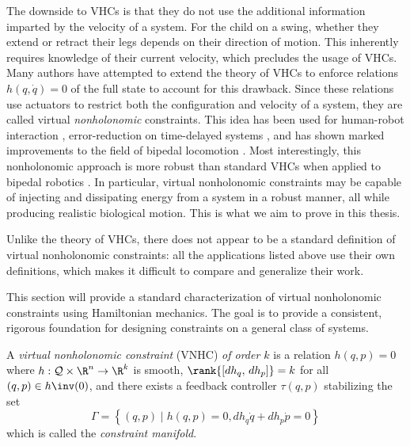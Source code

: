 The downside to VHCs is that they do not use the additional information imparted
by the velocity of a system.
For the child on a swing, whether they extend or retract their legs
depends on their direction of motion. 
This inherently requires knowledge of their current velocity, which precludes
the usage of VHCs. 
Many authors have attempted to extend the theory of VHCs to enforce relations
\(h(q,\dot{q}) = 0\) of the full state to account for this drawback. 
Since these relations use actuators to restrict both the configuration and
velocity of a system, they are called virtual \textit{nonholonomic} constraints.
This idea has been used for human-robot interaction
\cite{vnhc_human_robot_cooperation,psd_based_vnhc_redundant_manipulator,haptic_vnhc},
error-reduction on time-delayed systems \cite{vnhc_time_delay_teleop},
and has shown marked improvements to the field of bipedal locomotion 
\cite{nhvc_dynamic_walking,
hybrid_zero_dynamics_bipedal_nhvcs,output_nhvc_bipedal_control}.
Most interestingly, this nonholonomic approach is more robust
than standard VHCs when applied to bipedal robotics \cite{nhvc_incline_walking}.
In particular, virtual nonholonomic constraints may be capable of injecting and
dissipating energy from a system in a robust manner, all while producing
realistic biological motion. This is what we aim to prove in this thesis.

Unlike the theory of VHCs, there does not appear to be a standard definition of
virtual nonholonomic constraints: 
all the applications listed above use their own definitions, which makes it
difficult to compare and generalize their work. 

This section will provide a standard characterization of virtual nonholonomic
constraints using Hamiltonian mechanics. 
The goal is to provide a consistent, rigorous foundation for designing
constraints on a general class of systems.

\begin{defn}
    A \textit{virtual nonholonomic constraint} (VNHC) \textit{of order \(k\)} is a
    relation \(h(q,p) = 0\) where \(h : \mathcal{Q}\times\R^n \rightarrow \R^k\) is
    smooth, \(\rank{\left[ dh_q,\, dh_p \right]} = k\) for all 
    \((q,p) \in h\inv(0)\), and there exists a feedback controller \(\tau(q,p)\)
    stabilizing the set
    \[
        \Gamma = \left\{(q,p) \mid h(q,p) = 0, dh_q \dot{q} + dh_p \dot{p} = 0\right\}
    \]
    which is called the \textit{constraint manifold}.
\end{defn}

